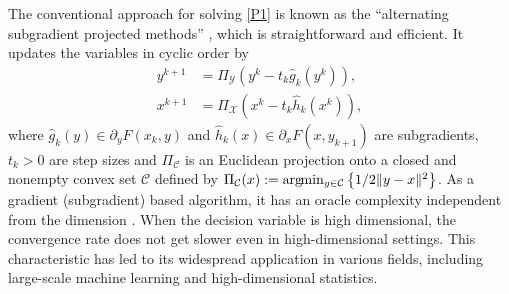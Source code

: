 \documentclass{svjour3}                %
\def \C {{\mathcal{C}}}
\def \X {{\mathcal{X}}}
\def \Y {{\mathcal{Y}}}
\def\argmin{\arg\hspace{-1mm}\min}
\begin{document}
The conventional approach for solving \eqref{P1} is known as the ``alternating subgradient projected methods'' \cite{L12,SB15}, which is straightforward and efficient. It updates the variables in cyclic order by
\begin{subequations}
\begin{align*}
y^{k+1}&= \Pi_\Y \left( y^k-t_k \hat{g}_k(y^k) \right),\\
x^{k+1}&= \Pi_\X \left( x^k-t_k \hat{h}_k(x^k) \right),
\end{align*}
\end{subequations}
where $\hat{g}_k(y)\in\partial_y F(x_k,y)$ and $\hat{h}_k(x)\in\partial_x F(x,y_{k+1})$ are subgradients, $t_k>0$ are step sizes and $\Pi_{\C}$ is an Euclidean projection onto a closed and nonempty convex set $\C$ defined by $\Pi_\C (x):= \argmin_{y\in \C} \left\{ 1/2\|y-x\|^2 \right\}$. As a gradient (subgradient) based algorithm, it has an oracle complexity independent from the dimension \cite{SB15}. When the decision variable is high dimensional, the convergence rate does not get slower even in high-dimensional settings. This characteristic has led to its widespread application in various fields, including large-scale machine learning and high-dimensional statistics.
\end{document}
